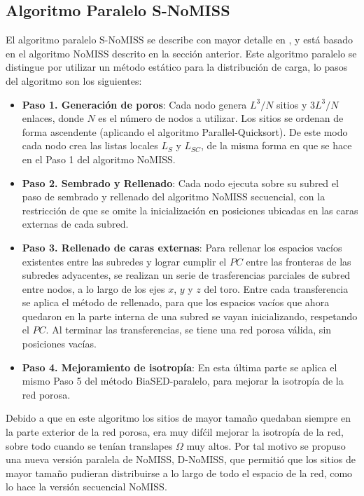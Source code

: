 \subsection{Algoritmo Paralelo S-NoMISS}
\label{subsubsec:ps-nomiss}
El algoritmo paralelo S-NoMISS se describe con mayor detalle en \cite{ref3}, y est\'a basado en el algoritmo NoMISS descrito en la sección 
anterior. Este algoritmo paralelo se distingue por utilizar un método estático para la distribución de carga, 
lo pasos del algoritmo son los siguientes:

\begin{itemize}
\item[] \textbf{Paso 1. Generación de poros}: Cada nodo genera $L^3/N$ sitios y $3L^3/N$ enlaces, donde $N$ es el número de nodos a utilizar. Los 
sitios se ordenan de forma ascendente (aplicando el algoritmo Parallel-Quicksort). De este modo cada nodo crea las listas locales 
$L_S$ y $L_{SC}$, de la misma forma en que se hace en el Paso 1 del algoritmo NoMISS.

\item[] \textbf{Paso 2. Sembrado y Rellenado}: Cada nodo ejecuta sobre su subred el paso de sembrado y rellenado del algoritmo NoMISS secuencial,
con la restricción de que se omite la inicialización en posiciones ubicadas en las caras externas de cada subred.

\item[] \textbf{Paso 3. Rellenado de caras externas}: Para rellenar los espacios vacíos existentes entre las subredes y lograr cumplir 
el $PC$ entre las fronteras de las subredes adyacentes, se realizan un serie de trasferencias parciales de subred entre nodos, 
a lo largo de los ejes $x$, $y$ y $z$ del toro. Entre cada transferencia se aplica el método de rellenado, para que los espacios vac\'ios
que ahora quedaron en la parte interna de una subred 
se vayan inicializando, respetando el $PC$. Al terminar las transferencias, se tiene una red porosa válida, sin posiciones vac\'ias.

\item[] \textbf{Paso 4. Mejoramiento de isotrop\'ia}: En esta \'ultima parte se aplica el mismo Paso 5 del método BiaSED-paralelo, para mejorar 
la isotrop\'ia de la red porosa.
\end{itemize}

Debido a que en este algoritmo los sitios de mayor tamaño quedaban siempre en la parte exterior de la red porosa, era muy dif\'cil
mejorar la isotrop\'ia de la red, sobre todo cuando se tenían translapes $\Omega$ muy altos. Por tal motivo se propuso una nueva versi\'on
paralela de NoMISS, D-NoMISS, que permiti\'o que los sitios de mayor tama\~no pudieran distribuirse a lo largo de todo el espacio de la red, 
como lo hace la versi\'on secuencial NoMISS.  

